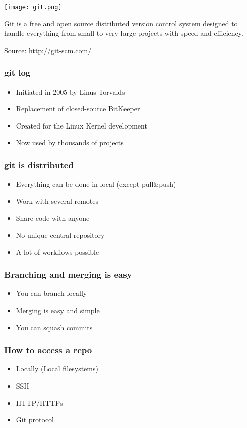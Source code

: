 \begin{frame}
    \begin{center}
        \texttt{[image: git.png]}
    \end{center}
    \begin{center}
        Git is a free and open source\pause{} distributed\pause{} version control system\pause{} designed to handle everything from small to very large projects\pause{} with speed and efficiency.
    \end{center}
    \begin{flushright}
        Source: http://git-scm.com/
    \end{flushright}
\end{frame}
\begin{frame}
    \frametitle{git log}
    \begin{itemize}
        \item{Initiated in 2005 by Linus Torvalds}
        \item{Replacement of closed-source BitKeeper}
        \item{Created for the Linux Kernel development}
        \item{Now used by thousands of projects}
    \end{itemize}
\end{frame}
\begin{frame}
    \frametitle{git is distributed}
    \begin{itemize}
        \item Everything can be done in local (except pull\&push)
        \item Work with several remotes
        \item Share code with anyone
        \item No unique central repository
        \item A lot of workflows possible
    \end{itemize}
\end{frame}
\begin{frame}
    \frametitle{Branching and merging is easy}
    \begin{itemize}
        \item You can branch locally
        \item Merging is easy and simple
        \item You can squash commits
    \end{itemize}
\end{frame}
\begin{frame}
    \frametitle{How to access a repo}
    \begin{itemize}
        \item Locally (Local filesystems)
        \item SSH
        \item HTTP/HTTPs
        \item Git protocol
    \end{itemize}
\end{frame}
